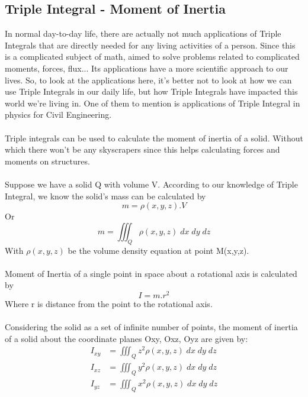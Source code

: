 \documentclass[a4paper]{article}
\begin{document}
	\subsection{Triple Integral - Moment of Inertia }
	In normal day-to-day life, there are actually not much applications of Triple Integrals that are directly needed for any living activities of a person. Since this is a complicated subject of math, aimed to solve problems related to complicated moments, forces, flux... Its applications have a more scientific approach to our lives. So, to look at the applications here, it's better not to look at how we can use Triple Integrals in our daily life, but how Triple Integrals have impacted this world we're living in. One of them to mention is applications of Triple Integral in physics for Civil Engineering.\\\\  
	Triple integrals can be used to calculate the moment of inertia of a solid. Without which there won't be any skyscrapers since this helps calculating forces and moments on structures.\\\\
	Suppose we have a solid Q with volume V. According to our knowledge of Triple Integral, we know the solid's mass can be calculated by 
	\begin{equation}
	m = \rho(x,y,z).V 
	\end{equation}
	Or
	\begin{equation}
	m=\iiint_Q \rho(x,y,z)\;dx\;dy\;dz
	\end{equation}
	With $\rho(x,y,z)$ be the volume density equation at point M(x,y,z).\\\\
	Moment of Inertia of a single point in space about a rotational axis is calculated by
	\begin{equation}
	I = m.r^2
	\end{equation}
	Where r is distance from the point to the rotational axis.\\\\
	Considering the solid as a set of infinite number of points, the moment of inertia of a solid about the coordinate planes Oxy, Oxz, Oyz are given by:\\
	\begin{align*}
	I_{xy} & = \iiint_Q z^2 \rho(x,y,z)\;dx\;dy\;dz \\
	I_{xz} & = \iiint_Q y^2 \rho(x,y,z)\;dx\;dy\;dz \\
	I_{yz} & = \iiint_Q x^2 \rho(x,y,z)\;dx\;dy\;dz \\
	\end{align*}
\end{document}

